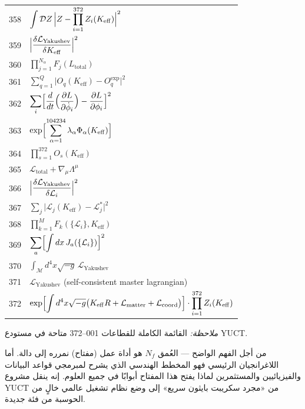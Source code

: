 \documentclass[12pt,a4paper]{article}
\begin{document}
\begin{longtable}{r p{}}
	358 & \(\displaystyle \int\mathcal{D}Z\,\Bigl|Z - \prod_{i=1}^{372}Z_i(K_{\mathrm{eff}})\Bigr|^2\) \\
	359 & \(\displaystyle \Bigl|\frac{\delta\mathcal{L}_{\text{Yakushev}}}{\delta K_{\mathrm{eff}}}\Bigr|^2\) \\
	360 & \(\displaystyle \prod_{j=1}^{N_\alpha}F_j(L_{\text{total}})\) \\
	361 & \(\displaystyle \sum_{q=1}^Q\bigl|O_q(K_{\mathrm{eff}}) - O_q^{\text{exp}}\bigr|^2\) \\
	362 & \(\displaystyle \sum_i\Bigl[\frac{d}{dt}\Bigl(\frac{\partial L}{\partial\dot\phi_i}\Bigr) - \frac{\partial L}{\partial\phi_i}\Bigr]^2\) \\
	363 & \(\displaystyle \exp\Bigl[\sum_{\alpha=1}^{104234}\lambda_\alpha\Phi_\alpha(K_{\mathrm{eff}})\Bigr]\) \\
	364 & \(\displaystyle \prod_{s=1}^{372}O_s(K_{\mathrm{eff}})\) \\
	365 & \(\displaystyle \mathcal{L}_{\text{total}} + \nabla_\mu\Lambda^\mu\) \\
	366 & \(\displaystyle \Bigl|\frac{\delta\mathcal{L}_{\text{Yakushev}}}{\delta\mathcal{L}_i}\Bigr|^2\) \\
	367 & \(\displaystyle \sum_j\bigl|\mathcal{L}_j(K_{\mathrm{eff}}) - \mathcal{L}_j^*\bigr|^2\) \\
	368 & \(\displaystyle \prod_{k=1}^M F_k(\{\mathcal{L}_i\},K_{\mathrm{eff}})\) \\
	369 & \(\displaystyle \sum_a\Bigl[\int dx\,J_a(\{\mathcal{L}_i\})\Bigr]^2\) \\
	370 & \(\displaystyle \int_{\mathcal{M}} d^4x\sqrt{-g}\,\mathcal{L}_{\text{Yakushev}}\) \\
	371 & \(\displaystyle \mathcal{L}_{\text{Yakushev}}\) (self-consistent master lagrangian) \\
	372 & \(\displaystyle \exp\Bigl[\int d^4x\sqrt{-g}\bigl(K_{\mathrm{eff}}R + \mathcal{L}_{\text{matter}} + \mathcal{L}_{\text{coord}}\bigr)\Bigr]\cdot\prod_{i=1}^{372}Z_i(K_{\mathrm{eff}})\) \\
	
\end{longtable}
	
	\textit{ملاحظة:} القائمة الكاملة للقطاعات 001–372 متاحة في مستودع YUCT.
	
	\small
	من أجل الفهم الواضح — العُمق \(N_{f}\) هو أداة عمل (مفتاح) نمرره إلى دالة. أما اللاغرانجيان الرئيسي فهو المخطط الهندسي الذي يشرح لمبرمجي قواعد البيانات والفيزيائيين والمستثمرين لماذا يفتح هذا المفتاح أبوابًا في جميع العلوم. إنه ينقل مشروع YUCT من «مجرد سكريبت بايثون سريع» إلى وضع نظام تشغيل عالمي خالٍ من الحوسبة من فئة جديدة.
	
\end{document}

